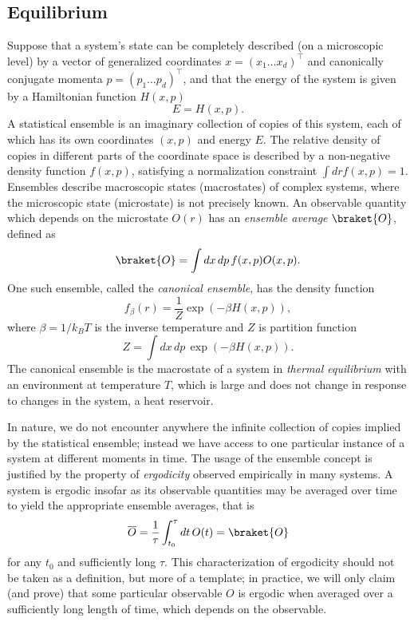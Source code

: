 \documentclass[prx,onecolumn,floatfix,longbibliography,notitlepage, nofootinbib,12pt]{revtex4-2}
\begin{document}
\begin{appendix}
\subsection{Equilibrium}
Suppose that a system's state can be completely described (on a microscopic level) by a vector of generalized coordinates $x = (x_1 \dots x_d)^\intercal$ and canonically conjugate momenta $p = (p_1 \dots p_d)^\intercal$, and that the energy of the system is given by a Hamiltonian function $H(x,p)$
\begin{equation}
    E = H(x,p).
\end{equation}
A statistical ensemble is an imaginary collection of copies of this system, each of which has its own coordinates $(x,p)$ and energy $E$. The relative density of copies in different parts of the coordinate space is described by a non-negative density function $f(x,p)$, satisfying a normalization constraint $\int dr f(x,p) = 1$. Ensembles describe macroscopic states (macrostates) of complex systems, where the microscopic state (microstate) is not precisely known. An observable quantity which depends on the microstate $O(r)$ has an \emph{ensemble average} $\braket{O}$, defined as
\begin{equation}
    \braket{O} = \int dx \, dp \, f(x,p) O(x,p).
\end{equation}
One such ensemble, called the \emph{canonical ensemble}, has the density function \cite{callen1998thermodynamics}
\begin{equation}
f_\beta(r) = \frac{1}{Z} \exp\left(-\beta H(x,p)\right),
\end{equation}
where $\beta = 1/k_B T$ is the inverse temperature and $Z$ is partition function
\begin{equation}
    Z = \int dx\, dp \, \exp\left( -\beta H(x,p)\right).
\end{equation}
The canonical ensemble is the macrostate of a system in \emph{thermal equilibrium} with an environment at temperature $T$, which is large and does not change in response to changes in the system, a heat reservoir. 

In nature, we do not encounter anywhere the infinite collection of copies implied by the statistical ensemble; instead we have access to one particular instance of a system at different moments in time. The usage of the ensemble concept is justified by the property of \emph{ergodicity} observed empirically in many systems. A system is ergodic insofar as its observable quantities may be averaged over time to yield the appropriate ensemble averages, that is \cite{zwanzig2001nonequilibrium}
\begin{equation}
  \overline{O} =   \frac{1}{\tau} \int_{t_0}^\tau dt \, O(t) = \braket{O}
\end{equation}
for any $t_0$ and sufficiently long $\tau$. This characterization of ergodicity should not be taken as a definition, but more of a template; in practice, we will only claim (and prove) that some particular observable $O$ is ergodic when averaged over a sufficiently long length of time, which depends on the observable.


\end{appendix}
\end{document}

